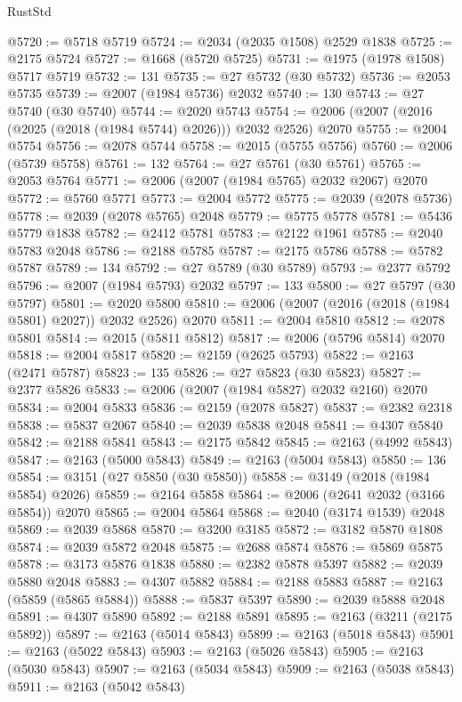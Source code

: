 \begin{lexlean}{RustStd}
\begin{coremodule}
@5720 := @5718 @5719
@5724 := @2034 (@2035 @1508) @2529 @1838
@5725 := @2175 @5724
@5727 := @1668 (@5720 @5725)
@5731 := @1975 (@1978 @1508) @5717 @5719
@5732 := 131
@5735 := @27 @5732 (@30 @5732)
@5736 := @2053 @5735
@5739 := @2007 (@1984 @5736) @2032
@5740 := 130
@5743 := @27 @5740 (@30 @5740)
@5744 := @2020 @5743
@5754 := @2006 (@2007 (@2016 (@2025 (@2018 (@1984 @5744) @2026))) @2032 @2526) @2070
@5755 := @2004 @5754
@5756 := @2078 @5744
@5758 := @2015 (@5755 @5756)
@5760 := @2006 (@5739 @5758)
@5761 := 132
@5764 := @27 @5761 (@30 @5761)
@5765 := @2053 @5764
@5771 := @2006 (@2007 (@1984 @5765) @2032 @2067) @2070
@5772 := @5760 @5771
@5773 := @2004 @5772
@5775 := @2039 (@2078 @5736)
@5778 := @2039 (@2078 @5765) @2048
@5779 := @5775 @5778
@5781 := @5436 @5779 @1838
@5782 := @2412 @5781
@5783 := @2122 @1961
@5785 := @2040 @5783 @2048
@5786 := @2188 @5785
@5787 := @2175 @5786
@5788 := @5782 @5787
@5789 := 134
@5792 := @27 @5789 (@30 @5789)
@5793 := @2377 @5792
@5796 := @2007 (@1984 @5793) @2032
@5797 := 133
@5800 := @27 @5797 (@30 @5797)
@5801 := @2020 @5800
@5810 := @2006 (@2007 (@2016 (@2018 (@1984 @5801) @2027)) @2032 @2526) @2070
@5811 := @2004 @5810
@5812 := @2078 @5801
@5814 := @2015 (@5811 @5812)
@5817 := @2006 (@5796 @5814) @2070
@5818 := @2004 @5817
@5820 := @2159 (@2625 @5793)
@5822 := @2163 (@2471 @5787)
@5823 := 135
@5826 := @27 @5823 (@30 @5823)
@5827 := @2377 @5826
@5833 := @2006 (@2007 (@1984 @5827) @2032 @2160) @2070
@5834 := @2004 @5833
@5836 := @2159 (@2078 @5827)
@5837 := @2382 @2318
@5838 := @5837 @2067
@5840 := @2039 @5838 @2048
@5841 := @4307 @5840
@5842 := @2188 @5841
@5843 := @2175 @5842
@5845 := @2163 (@4992 @5843)
@5847 := @2163 (@5000 @5843)
@5849 := @2163 (@5004 @5843)
@5850 := 136
@5854 := @3151 (@27 @5850 (@30 @5850))
@5858 := @3149 (@2018 (@1984 @5854) @2026)
@5859 := @2164 @5858
@5864 := @2006 (@2641 @2032 (@3166 @5854)) @2070
@5865 := @2004 @5864
@5868 := @2040 (@3174 @1539) @2048
@5869 := @2039 @5868
@5870 := @3200 @3185
@5872 := @3182 @5870 @1808
@5874 := @2039 @5872 @2048
@5875 := @2688 @5874
@5876 := @5869 @5875
@5878 := @3173 @5876 @1838
@5880 := @2382 @5878 @5397
@5882 := @2039 @5880 @2048
@5883 := @4307 @5882
@5884 := @2188 @5883
@5887 := @2163 (@5859 (@5865 @5884))
@5888 := @5837 @5397
@5890 := @2039 @5888 @2048
@5891 := @4307 @5890
@5892 := @2188 @5891
@5895 := @2163 (@3211 (@2175 @5892))
@5897 := @2163 (@5014 @5843)
@5899 := @2163 (@5018 @5843)
@5901 := @2163 (@5022 @5843)
@5903 := @2163 (@5026 @5843)
@5905 := @2163 (@5030 @5843)
@5907 := @2163 (@5034 @5843)
@5909 := @2163 (@5038 @5843)
@5911 := @2163 (@5042 @5843)

\end{coremodule}
\end{lexlean}
